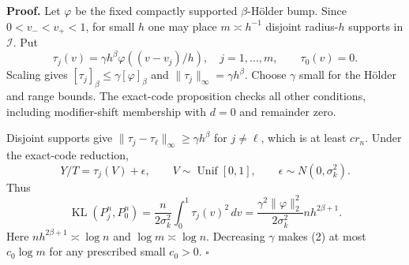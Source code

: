 \textbf{Proof.}
Let \(\varphi\) be the fixed compactly supported \(\beta\)-H\"older bump.  Since \(0<v_-<v_+<1\), for small \(h\) one may place \(m\asymp h^{-1}\) disjoint radius-\(h\) supports in \(\mathcal I\).  Put
\[
 \tau_j(v)=\gamma h^\beta\varphi((v-v_j)/h),\quad j=1,\ldots,m,
 \qquad \tau_0(v)=0. \tag{1}
\]
Scaling gives \([\tau_j]_\beta\le\gamma[\varphi]_\beta\) and \(\|\tau_j\|_\infty=\gamma h^\beta\).  Choose \(\gamma\) small for the H\"older and range bounds.  The exact-code proposition checks all other conditions, including modifier-shift membership with \(d=0\) and remainder zero.

Disjoint supports give \(\|\tau_j-\tau_\ell\|_\infty\ge\gamma h^\beta\) for \(j\ne\ell\), which is at least \(cr_n\).  Under the exact-code reduction,
\[
 Y/T=\tau_j(V)+\epsilon,\qquad V\sim\operatorname{Unif}[0,1],
 \qquad \epsilon\sim N(0,\sigma_k^2).
\]
Thus
\[
 \operatorname{KL}(P_j^n,P_0^n)
 =\frac{n}{2\sigma_k^2}\int_0^1\tau_j(v)^2\,dv
 =\frac{\gamma^2\|\varphi\|_2^2}{2\sigma_k^2}nh^{2\beta+1}. \tag{2}
\]
Here \(nh^{2\beta+1}\asymp\log n\) and \(\log m\asymp\log n\).  Decreasing \(\gamma\) makes (2) at most \(c_0\log m\) for any prescribed small \(c_0>0\). \(\square\)